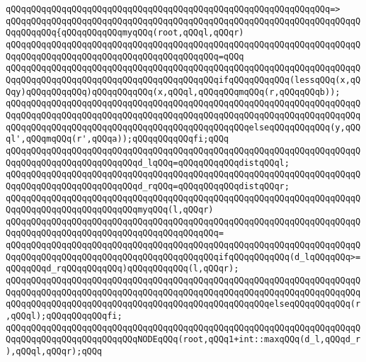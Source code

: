 \verb|qQQqqQQqqQQqqQQqqQQqqQQqqQQqqQQqqQQqqQQqqQQqqQQqqQQqqQQqqQQqqQQq=>|\newline
\verb|qQQqqQQqqQQqqQQqqQQqqQQqqQQqqQQqqQQqqQQqqQQqqQQqqQQqqQQqqQQqqQQqqQQqqQQqqQQqqQQq{qQQqqQQqqQQqmyqQQq(root,qQQql,qQQqr)|\newline
\verb|qQQqqQQqqQQqqQQqqQQqqQQqqQQqqQQqqQQqqQQqqQQqqQQqqQQqqQQqqQQqqQQqqQQqqQQqqQQqqQQqqQQqqQQqqQQqqQQqqQQqqQQqqQQqqQQq=qQQq|\newline
\verb|qQQqqQQqqQQqqQQqqQQqqQQqqQQqqQQqqQQqqQQqqQQqqQQqqQQqqQQqqQQqqQQqqQQqqQQqqQQqqQQqqQQqqQQqqQQqqQQqqQQqqQQqqQQqqQQqifqQQqqQQqqQQq(lessqQQq(x,qQQqy)qQQqqQQqqQQq)qQQqqQQqqQQq(x,qQQql,qQQqqQQqmqQQq(r,qQQqqQQqb));|\newline
\verb|qQQqqQQqqQQqqQQqqQQqqQQqqQQqqQQqqQQqqQQqqQQqqQQqqQQqqQQqqQQqqQQqqQQqqQQqqQQqqQQqqQQqqQQqqQQqqQQqqQQqqQQqqQQqqQQqqQQqqQQqqQQqqQQqqQQqqQQqqQQqqQQqqQQqqQQqqQQqqQQqqQQqqQQqqQQqqQQqqQQqqQQqqQQqelseqQQqqQQqqQQq(y,qQQql',qQQqmqQQq(r',qQQqa));qQQqqQQqqQQqfi;qQQq|\newline
\newline
\verb|qQQqqQQqqQQqqQQqqQQqqQQqqQQqqQQqqQQqqQQqqQQqqQQqqQQqqQQqqQQqqQQqqQQqqQQqqQQqqQQqqQQqqQQqqQQqqQQqd_lqQQq=qQQqqQQqqQQqdistqQQql;|\newline
\verb|qQQqqQQqqQQqqQQqqQQqqQQqqQQqqQQqqQQqqQQqqQQqqQQqqQQqqQQqqQQqqQQqqQQqqQQqqQQqqQQqqQQqqQQqqQQqqQQqd_rqQQq=qQQqqQQqqQQqdistqQQqr;|\newline
\newline
\verb|qQQqqQQqqQQqqQQqqQQqqQQqqQQqqQQqqQQqqQQqqQQqqQQqqQQqqQQqqQQqqQQqqQQqqQQqqQQqqQQqqQQqqQQqqQQqqQQqmyqQQq(l,qQQqr)|\newline
\verb|qQQqqQQqqQQqqQQqqQQqqQQqqQQqqQQqqQQqqQQqqQQqqQQqqQQqqQQqqQQqqQQqqQQqqQQqqQQqqQQqqQQqqQQqqQQqqQQqqQQqqQQqqQQqqQQq=|\newline
\verb|qQQqqQQqqQQqqQQqqQQqqQQqqQQqqQQqqQQqqQQqqQQqqQQqqQQqqQQqqQQqqQQqqQQqqQQqqQQqqQQqqQQqqQQqqQQqqQQqqQQqqQQqqQQqqQQqifqQQqqQQqqQQq(d_lqQQqqQQq>=qQQqqQQqd_rqQQqqQQqqQQq)qQQqqQQqqQQq(l,qQQqr);|\newline
\verb|qQQqqQQqqQQqqQQqqQQqqQQqqQQqqQQqqQQqqQQqqQQqqQQqqQQqqQQqqQQqqQQqqQQqqQQqqQQqqQQqqQQqqQQqqQQqqQQqqQQqqQQqqQQqqQQqqQQqqQQqqQQqqQQqqQQqqQQqqQQqqQQqqQQqqQQqqQQqqQQqqQQqqQQqqQQqqQQqqQQqqQQqqQQqqQQqelseqQQqqQQqqQQq(r,qQQql);qQQqqQQqqQQqfi;|\newline
\newline
\verb|qQQqqQQqqQQqqQQqqQQqqQQqqQQqqQQqqQQqqQQqqQQqqQQqqQQqqQQqqQQqqQQqqQQqqQQqqQQqqQQqqQQqqQQqqQQqqQQqNODEqQQq(root,qQQq1+int::maxqQQq(d_l,qQQqd_r),qQQql,qQQqr);qQQq|\newline

